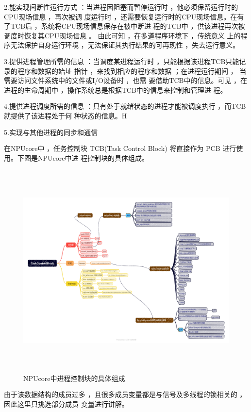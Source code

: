 2.能实现间断性运行方式 ：当进程因阻塞而暂停运行时 ，他必须保留运行时的CPU现场信息 ，再次被调
度运行时 ，还需要恢复运行时的CPU现场信息。在有了TCB后 ，系统将CPU现场信息保存在被中断进 程的TCB中 ，供该进程再次被调度时恢复其CPU现场信息 。  由此可知 ，在多道程序环境下 ，传统意义 上的程序无法保护自身运行环境 ，无法保证其执行结果的可再现性 ，失去运行意义。

3.提供进程管理所需的信息 ：当调度某进程运行时 ，只能根据该进程TCB只能记录的程序和数据的始址
指针 ，来找到相应的程序和数据 ；在进程运行期间 ，  当需要访问文件系统中的文件或I/O设备时 ，也需 要借助TCB中的信息。可见 ，在进程的生命周期中 ，操作系统总是根据TCB中的信息来控制和管理进 程。

4.提供进程调度所需的信息 ：只有处于就绪状态的进程才能被调度执行 ，而TCB就提供了该进程处于何
种状态的信息。H

5.实现与其他进程的同步和通信

在NPUcore中 ，任务控制块 TCB(Task Control Block) 将直接作为 PCB 进行使用。下图是NPUcore中进 程控制块的具体组成。

\begin{figure}[H]
	\centering
	\includegraphics[width=14cm,height=11cm]{figures/04-02-01-NPUcore中进程控制块的具体组成.png}
	\caption{NPUcore中进程控制块的具体组成}
\end{figure}    

由于该数据结构的成员过多 ，且很多成员变量都是与信号及多线程的锁相关的 ，因此这里只挑选部分成员 变量进行讲解。

